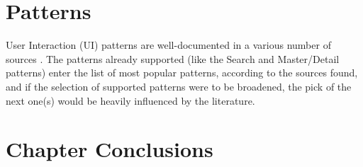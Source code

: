 \section{Patterns}\label{sec:patterns}
User Interaction (UI) patterns are well-documented in a various number of sources \cite{tidwell2010designing,van2001patterns, neil12standard,sinnig2005patterns}. The patterns already supported (like the Search and Master/Detail patterns) enter the list of most popular patterns, according to the sources found, and if the selection of supported patterns were to be broadened, the pick of the next one(s) would be heavily influenced by the literature.
\section{Chapter Conclusions}
